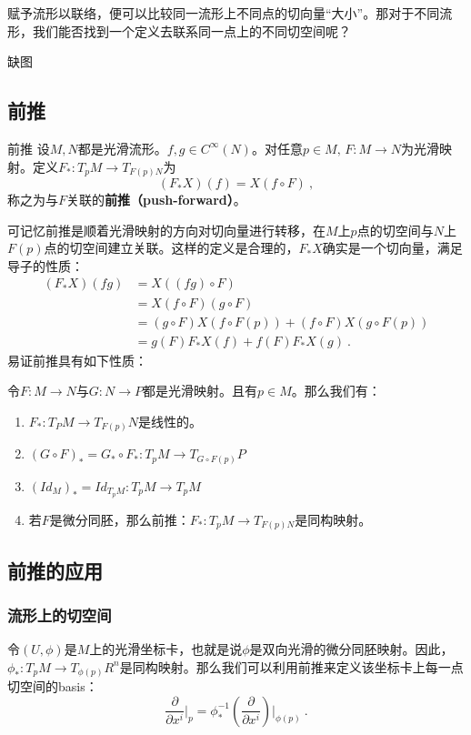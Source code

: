 赋予流形以联络，便可以比较同一流形上不同点的切向量“大小”。那对于不同流形，我们能否找到一个定义去联系同一点上的不同切空间呢？

\begin{issues}
\issueDraft 缺图
\end{issues}

\subsection{前推}
\begin{definition}{前推}
设$M,N$都是光滑流形。$f,g\in C^{\infty}(N)$。对任意$p\in M,\,F:M\rightarrow N$为光滑映射。定义$F_*:T_p M\rightarrow T_{F(p)N}$为
\begin{equation}
(F_*X)(f)=X(f\circ F)~,
\end{equation}
称之为与$F$关联的\textbf{前推（push-forward）}。
\end{definition}
可记忆前推是顺着光滑映射的方向对切向量进行转移，在$M$上$p$点的切空间与$N$上$F(p)$点的切空间建立关联。这样的定义是合理的，$F_*X$确实是一个切向量，满足导子的性质：
\begin{equation}
\begin{aligned}
(F_*X)(fg)&=X((fg)\circ F)\\
&=X(f\circ F)(g\circ F)\\
&=(g\circ F)X(f\circ F(p))+(f\circ F)X(g\circ F(p))\\
&=g(F)F_*X(f)+f(F)F_*X(g)~.
\end{aligned}
\end{equation}
易证前推具有如下性质：\begin{theorem}{}
令$F:M\rightarrow N$与$G:N\rightarrow P$都是光滑映射。且有$p\in M$。那么我们有：
\begin{enumerate}
\item $F_*:T_P M\rightarrow T_{F(p)}N$是线性的。
\item $(G\circ F)_*=G_*\circ F_*:T_p M\rightarrow T_{G\circ F(p)}P$
\item $(Id_M)_*=Id_{T_p M}:T_p M\rightarrow T_p M$
\item 若$F$是微分同胚，那么前推：$F_*: T_p M\rightarrow T_{F(p)N}$是同构映射。
\end{enumerate}
\end{theorem}

\subsection{前推的应用}
\subsubsection{流形上的切空间}
令$(U,\phi)$是$M$上的光滑坐标卡，也就是说$\phi$是双向光滑的微分同胚映射。因此，$\phi_*:T_p M\rightarrow T_{\phi(p)}R^n$是同构映射。那么我们可以利用前推来定义该坐标卡上每一点切空间的basis：
\begin{equation}
\frac{\partial}{\partial x^i}\bigg|_p=\phi^{-1}_* (\frac{\partial}{\partial x^i})\bigg|_{\phi(p)}~.
\end{equation}

